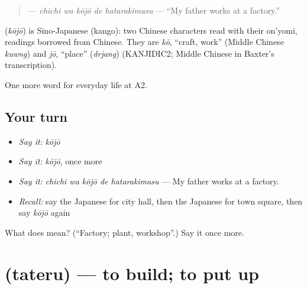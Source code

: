 \begin{quote}
\textbf{  } — \emph{chichi wa kōjō de hatarakimasu} — \textquotedblleft{}My father works at a factory.\textquotedblright{}
\end{quote}

\begin{cousinweb}
\textbf{} (\emph{kōjō}) is Sino-Japanese (kango): two Chinese characters read with their on'yomi, readings borrowed from Chinese. They are \emph{kō}, \textquotedblleft{}craft, work\textquotedblright{} (Middle Chinese \emph{kuwng}) and \emph{jō}, \textquotedblleft{}place\textquotedblright{} (\emph{drjang}) (KANJIDIC2; Middle Chinese in Baxter's transcription).
\end{cousinweb}

\begin{grammarlens}[title={What you've built}]
One more word for everyday life at A2.
\end{grammarlens}

\subsection*{Your turn}
\begin{itemize}
\raggedright
  \item \emph{Say it:} \emph{kōjō}
  \item \emph{Say it:} \emph{kōjō}, once more
  \item \emph{Say it:} \emph{chichi wa kōjō de hatarakimasu} — My father works at a factory.
  \item \emph{Recall:} say the Japanese for city hall, then the Japanese for town square, then say \emph{kōjō} again
\end{itemize}

\begin{tcolorbox}[breakable,colback=teal!4,colframe=teal!35!black,title={Before you move on}]
What does  mean? (\textquotedblleft{}Factory; plant, workshop\textquotedblright{}.) Say it once more.
\end{tcolorbox}
\section[\texorpdfstring{\ja{たてる} (tateru)}{たてる (tateru)}]{ (tateru) — to build; to put up}

\label{lesson:JA-C197-tateru}



